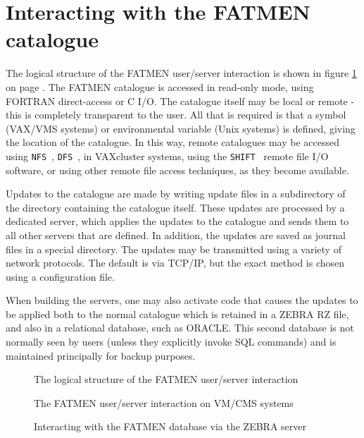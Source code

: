 \section{Interacting with the FATMEN catalogue}
\par
The logical structure of the FATMEN user/server interaction
is shown in figure \ref{FATFIG0} on page \pageref{FATFIG0}.
The FATMEN catalogue is accessed in read-only mode, using FORTRAN
direct-access or C I/O. The catalogue itself may be local or remote - 
this is completely transparent to the user. All that is required is that
a symbol (VAX/VMS systems) or environmental variable (Unix systems) is
defined, giving the location of the catalogue. 
In this way, remote catalogues may be accessed using {\tt NFS}~\cite{bib-NFS},
{\tt DFS}~\cite{bib-DFS}, in VAXcluster systems, 
using the {\tt SHIFT}~\cite{bib-SHIFT}
remote file I/O software, or using other remote file access techniques,
as they become available.
\par
Updates to the catalogue are made by writing update files in a subdirectory
of the directory containing the catalogue itself. These updates are
processed by a dedicated server, which applies the updates to the catalogue
and sends them to all other servers that are defined. In addition,
the updates are saved as journal files in a special directory.
The updates may be transmitted using a variety of network protocols.
The default is via TCP/IP, but the exact method is chosen using
a configuration file.
\par
When building the servers, one may also activate code that causes
the updates to be applied both to the normal catalogue which is
retained in a ZEBRA RZ file, and also in a relational database, such
as ORACLE. This second database is not normally seen by users (unless
they explicitly invoke SQL commands) and is maintained principally
for backup purposes. 
\begin{figure}
\caption{The logical structure of the FATMEN user/server interaction}
\begin{center}\mbox{}\end{center}
\label{FATFIG0}
\end{figure}
\begin{figure}
\caption{The FATMEN user/server interaction on VM/CMS systems}
\begin{center}\mbox{}\end{center}
\label{FATFIG1}
\end{figure}
\begin{figure}
\caption{Interacting with the FATMEN database via the ZEBRA server}
\begin{center}\mbox{}\end{center}
\label{FATFIG2}
\end{figure}
